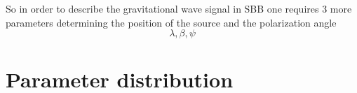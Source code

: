 \documentclass[11pt]{report}
\begin{document}
So in order to describe the gravitational wave signal in SBB  one requires 
3 more parameters determining the position of the source and the polarization angle
\begin{equation}
\lambda, \beta, \psi
\end{equation}
 



\section{Parameter distribution}
\end{document}
